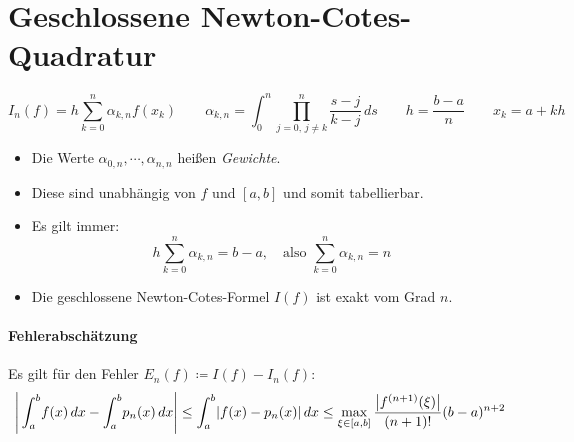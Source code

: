 	\section{Geschlossene Newton-Cotes-Quadratur} %
		\begin{equation*}
			I_n(f) = h \sum_{k=0}^{n} \alpha_{k,n} f(x_k) \qquad \alpha_{k,n} = \int_{0}^{n} \! \prod_{j = 0,\, j \neq k}^{n} \frac{s-j}{k-j} \, ds \qquad h = \frac{b-a}{n} \qquad x_k = a + kh
		\end{equation*}
		\begin{itemize}
			\item Die Werte \( \alpha_{0, n}, \cdots, \alpha_{n, n} \) heißen \textit{Gewichte}.
			\item Diese sind unabhängig von \(f\) und \([a, b]\) und somit tabellierbar.
			\item Es gilt immer:
				\begin{equation*}
					h \sum_{k=0}^{n} \alpha_{k,n} = b - a, \quad\textrm{also } \sum_{k=0}^{n} \alpha_{k, n} = n
				\end{equation*}
			\item Die geschlossene Newton-Cotes-Formel \(I(f)\) ist exakt vom Grad \(n\).
		\end{itemize}

		\paragraph{Fehlerabschätzung}
			Es gilt für den Fehler \( E_n(f) \coloneqq I(f) - I_n(f) \):
			\begin{equation*}
				\Bigg\lvert \int_{a}^{b} \! f(x) \, dx - \int_{a}^{b} \! p_n(x) \, dx \Bigg\rvert \leq \int_{a}^{b} \! \abs{f(x) - p_n(x)} \, dx \leq \max_{\xi \in [a, b]} \frac{\abs{f^{(n + 1)}(\xi)}}{(n + 1)!} (b - a) ^ {n+2}
			\end{equation*}


